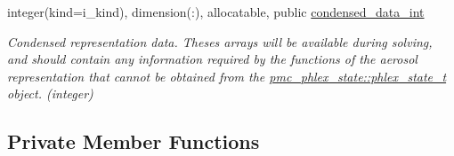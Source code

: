 \begin{DoxyCompactItemize}
integer(kind=i\+\_\+kind), dimension(\+:), allocatable, public \mbox{\hyperlink{structpmc__aero__rep__data_1_1aero__rep__data__t_a765bb678b9c7428ca7e3026dfdee287a}{condensed\+\_\+data\+\_\+int}}
\begin{DoxyCompactList}\small\item\em Condensed representation data. Theses arrays will be available during solving, and should contain any information required by the functions of the aerosol representation that cannot be obtained from the \mbox{\hyperlink{structpmc__phlex__state_1_1phlex__state__t}{pmc\+\_\+phlex\+\_\+state\+::phlex\+\_\+state\+\_\+t}} object. (integer) \end{DoxyCompactList}\end{DoxyCompactItemize}
\subsection*{Private Member Functions}
